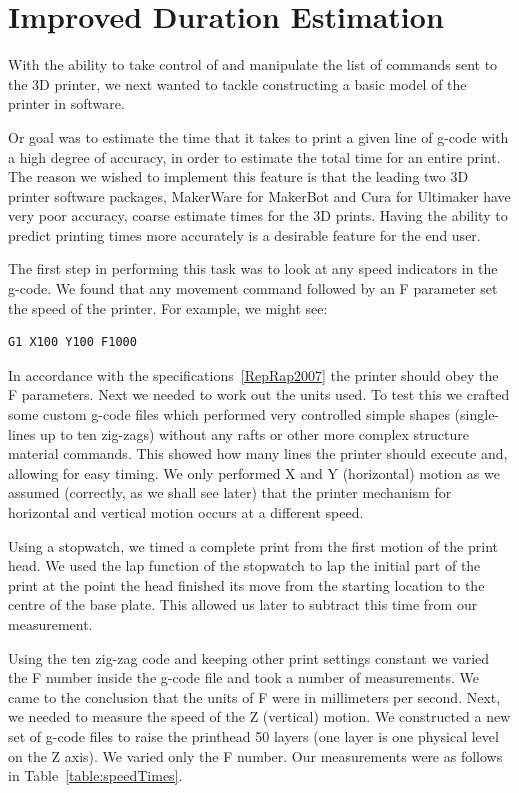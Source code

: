\documentclass[11pt]{report} %
\begin{document}
\section{Improved Duration Estimation}
	With the ability to take control of and manipulate the list of commands sent to the 3D printer, we next wanted to tackle constructing a basic model of the printer in software.

	Or goal was to estimate the time that it takes to print a given line of g-code with a high degree of accuracy, in order to estimate the total time for an entire print. The reason we wished to implement this feature is that the leading two 3D printer software packages, MakerWare for MakerBot and Cura for Ultimaker have very poor accuracy, coarse estimate times for the 3D prints. Having the ability to predict printing times more accurately is a desirable feature for the end user.

	The first step in performing this task was to look at any speed indicators in the g-code. We found that any movement command followed by an F parameter set the speed of the printer. For example, we might see:
\begin{verbatim}
G1 X100 Y100 F1000
\end{verbatim}

In accordance with the specifications~\ref{RepRap2007} the printer should obey the F parameters. Next we needed to work out the units used. To test this we crafted some custom g-code files which performed very controlled simple shapes (single-lines up to ten zig-zags) without any rafts or other more complex structure material commands. This showed how many lines the printer should execute and, allowing for easy timing. We only performed X and Y (horizontal) motion as we assumed (correctly, as we shall see later) that the printer mechanism for horizontal and vertical motion occurs at a different speed.

	Using a stopwatch, we timed a complete print from the first motion of the print head. We used the lap function of the stopwatch to lap the initial part of the print at the point the head finished its move from the starting location to the centre of the base plate. This allowed us later to subtract this time from our measurement.

	Using the ten zig-zag code and keeping other print settings constant we varied the F number inside the g-code file and took a number of measurements. We came to the conclusion that the units of F were in millimeters per second. Next, we needed to measure the speed of the Z (vertical) motion. We constructed a new set of g-code files to raise the printhead 50 layers (one layer is one physical level on the Z axis). We varied only the F number. Our measurements were as follows in Table~\ref{table:speedTimes}.
\end{document}
